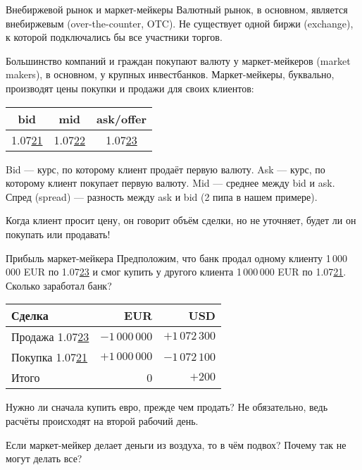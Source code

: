 \documentclass{beamer}
\begin{document}
\begin{frame}{Внебиржевой рынок и маркет-мейкеры}
\justify
Валютный рынок, в основном, является \alert{внебиржевым} (over-the-counter, OTC). Не 
существует одной биржи (exchange), к которой подключались бы все участники торгов.

\justify
Большинство компаний и граждан покупают валюту у маркет-мейкеров (market makers), в 
основном, у крупных инвестбанков. Маркет-мейкеры, буквально, производят цены покупки 
и продажи для своих клиентов:

\centering
\begin{tabular}{c|c|c}
bid & mid & ask/offer \\ \hline
1.07\underline{21} & 1.07\underline{22} & 1.07\underline{23}
\end{tabular}

\justify
Bid --- курс, по которому клиент продаёт первую валюту. Ask --- курс, по которому клиент 
покупает первую валюту. Mid --- среднее между bid и ask. Спред (spread) --- разность между 
ask и bid (2 пипа в нашем примере).

\justify
Когда клиент просит цену, он говорит объём сделки, но не уточняет, будет ли он покупать или продавать!
\end{frame}



\begin{frame}{Прибыль маркет-мейкера}
\justify
Предположим, что банк продал одному клиенту 1\,000\,000 EUR по 1.07\underline{23} и
смог купить у другого клиента 1\,000\,000 EUR по 1.07\underline{21}. Сколько 
заработал банк?

\centering
\begin{tabular}{l|r|r}
Сделка & EUR & USD \\
\hline
Продажа 1.07\underline{23} & $-1\,000\,000$ & $+1\,072\,300$ \\
Покупка 1.07\underline{21} & $+1\,000\,000$ & $-1\,072\,100$ \\
\hline
Итого & 0 & $+200$
\end{tabular}

\justify
Нужно ли сначала купить евро, прежде чем продать? Не обязательно, ведь расчёты 
происходят на второй рабочий день.

\justify
Если маркет-мейкер делает деньги из воздуха, то в чём подвох? Почему так не могут
делать все?
\end{frame}
\end{document}
